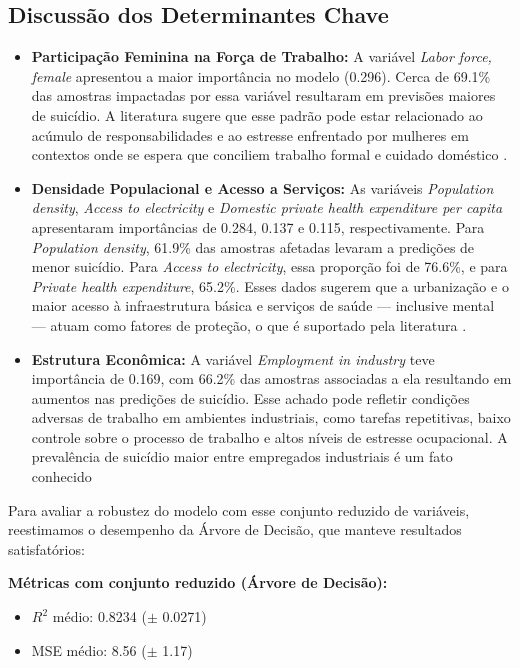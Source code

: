 \documentclass[letterpaper]{article}
\begin{document}
\subsection*{Discussão dos Determinantes Chave}

\begin{itemize}
\item \textbf{Participação Feminina na Força de Trabalho:} A variável \textit{Labor force, female} apresentou a maior importância no modelo (0.296). Cerca de 69.1\% das amostras impactadas por essa variável resultaram em previsões maiores de suicídio. A literatura sugere que esse padrão pode estar relacionado ao acúmulo de responsabilidades e ao estresse enfrentado por mulheres em contextos onde se espera que conciliem trabalho formal e cuidado doméstico \cite{female_labor_force_impact_stack}.

\item \textbf{Densidade Populacional e Acesso a Serviços:} As variáveis \textit{Population density}, \textit{Access to electricity} e \textit{Domestic private health expenditure per capita} apresentaram importâncias de 0.284, 0.137 e 0.115, respectivamente. Para \textit{Population density}, 61.9\% das amostras afetadas levaram a predições de menor suicídio. Para \textit{Access to electricity}, essa proporção foi de 76.6\%, e para \textit{Private health expenditure}, 65.2\%. Esses dados sugerem que a urbanização e o maior acesso à infraestrutura básica e serviços de saúde — inclusive mental — atuam como fatores de proteção, o que é suportado pela literatura \cite{kegler2017trends}.

\item \textbf{Estrutura Econômica:} A variável \textit{Employment in industry} teve importância de 0.169, com 66.2\% das amostras associadas a ela resultando em aumentos nas predições de suicídio. Esse achado pode refletir condições adversas de trabalho em ambientes industriais, como tarefas repetitivas, baixo controle sobre o processo de trabalho e altos níveis de estresse ocupacional. A prevalência de suicídio maior entre empregados industriais é um fato conhecido \cite{sussell2023suicide}
\end{itemize}

Para avaliar a robustez do modelo com esse conjunto reduzido de variáveis, reestimamos o desempenho da Árvore de Decisão, que manteve resultados satisfatórios:

\vspace{0.5em}
\noindent
\textbf{Métricas com conjunto reduzido (Árvore de Decisão):}
\begin{itemize}
\item $R^2$ médio: 0.8234 ($\pm$ 0.0271)
\item MSE médio: 8.56 ($\pm$ 1.17)
\end{itemize}
\end{document}
